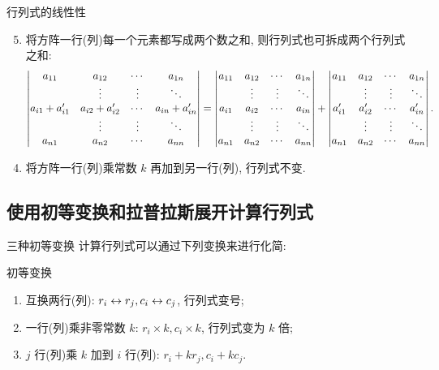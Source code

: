\begin{frame}{行列式的线性性}
	\onslide<+->
	\begin{alertblock@}
		\begin{enumerate}
			\setcounter{enumi}{4}
			\item 将方阵一行(列)每一个元素都写成两个数之和, 则行列式也可拆成两个行列式之和:
		\[\left|\begin{matrix}a_{11}&a_{12}&\cdots&a_{1n}\\
		&\vdots&\vdots&\ddots\\
		a_{i1}+a'_{i1}&a_{i2}+a'_{i2}&\cdots&a_{in}+a'_{in}\\
		&\vdots&\vdots&\ddots\\
		a_{n1}&a_{n2}&\cdots&a_{nn}\end{matrix}\right|=\left|\begin{matrix}a_{11}&a_{12}&\cdots&a_{1n}\\
		&\vdots&\vdots&\ddots\\
		a_{i1}&a_{i2}&\cdots&a_{in}\\
		&\vdots&\vdots&\ddots\\
		a_{n1}&a_{n2}&\cdots&a_{nn}\end{matrix}\right|+\left|\begin{matrix}a_{11}&a_{12}&\cdots&a_{1n}\\
		&\vdots&\vdots&\ddots\\
		a'_{i1}&a'_{i2}&\cdots&a'_{in}\\
		&\vdots&\vdots&\ddots\\
		a_{n1}&a_{n2}&\cdots&a_{nn}\end{matrix}\right|.\]
		\end{enumerate}
	\end{alertblock@}
	\onslide<+->
	\begin{alertblock@}
		\begin{enumerate}
			\setcounter{enumi}{3}
			\item 将方阵一行(列)乘常数 $k$ 再加到另一行(列), 行列式不变.
		\end{enumerate}
	\end{alertblock@}
\end{frame}


\subsection{使用初等变换和拉普拉斯展开计算行列式}
\begin{frame}{三种初等变换}
	\onslide<+->
	计算行列式可以通过下列变换来进行化简:
	\onslide<+->
	\begin{block}{初等变换}
		\begin{enumerate}
		\item 互换两行(列): \alert{$r_i\leftrightarrow r_j, c_i\leftrightarrow c_j$}, 行列式变号;
		\item 一行(列)乘非零常数 $k$: \alert{$r_i\times k, c_i\times k$}, 行列式变为 $k$ 倍;
		\item $j$ 行(列)乘 $k$ 加到 $i$ 行(列): \alert{$r_i+kr_j, c_i+kc_j$}.
	\end{enumerate}
	\end{block}
\end{frame}


